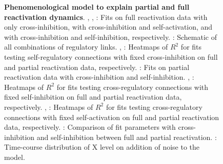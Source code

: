 \documentclass[11pt,a4paper]{article}
\begin{document}
\begin{figure}[p]
    \caption{\textbf{Phenomenological model to explain partial and full reactivation dynamics}. , , : Fits on full reactivation data with only cross-inhibition, with cross-inhibition and self-activation, and with cross-inhibition and self-inhibition, respectively. : Schematic of all combinations of regulatory links. , : Heatmaps of $R^2$ for fits testing self-regulatory connections with fixed cross-inhibition on full and partial reactivation data, respectively. : Fits on partial reactivation data with cross-inhibition and self-inhibition. , : Heatmaps of $R^2$ for fits testing cross-regulatory connections with fixed self-inhibition on full and partial reactivation data, respectively. , : Heatmaps of $R^2$ for fits testing cross-regulatory connections with fixed self-activation on full and partial reactivation data, respectively. : Comparison of fit parameters with cross-inhibition and self-inhibition between full and partial reactivation. : Time-course distribution of X level on addition of noise to the model.}
\end{figure}
 
\end{document}
